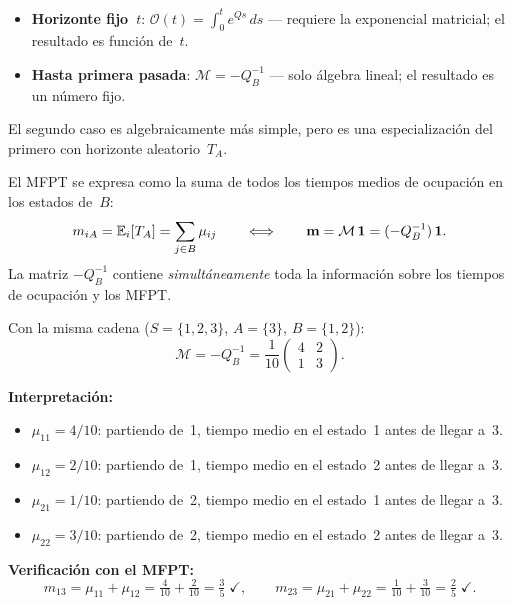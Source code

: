 \documentclass[11pt, letterpaper]{article}
\begin{document}
\begin{notabox}
  \begin{itemize}
    \item \textbf{Horizonte fijo~$t$}: $\mathcal{O}(t)=\int_0^t e^{Qs}\,ds$
      — requiere la exponencial matricial; el resultado es función de~$t$.
    \item \textbf{Hasta primera pasada}: $\mathcal{M}=-Q_B^{-1}$
      — solo álgebra lineal; el resultado es un número fijo.
  \end{itemize}
  El segundo caso es algebraicamente más simple, pero es una
  especialización del primero con horizonte aleatorio~$T_A$.
\end{notabox}

\begin{notabox}
  El MFPT se expresa como la suma de todos los tiempos medios de
  ocupación en los estados de~$B$:
  \[
    m_{iA} = \mathbb{E}_i[T_A] = \sum_{j\in B} \mu_{ij}
    \qquad\Longleftrightarrow\qquad
    \mathbf{m} = \mathcal{M}\,\mathbf{1} = (-Q_B^{-1})\,\mathbf{1}.
  \]
  La matriz $-Q_B^{-1}$ contiene \emph{simultáneamente} toda la
  información sobre los tiempos de ocupación y los MFPT.
\end{notabox}

\begin{ejemplobox}
  Con la misma cadena ($S=\{1,2,3\}$, $A=\{3\}$, $B=\{1,2\}$):
  \[
    \mathcal{M} = -Q_B^{-1}
    = \frac{1}{10}\begin{pmatrix} 4 & 2 \\ 1 & 3 \end{pmatrix}.
  \]

  \textbf{Interpretación:}
  \begin{itemize}
    \item $\mu_{11}=4/10$: partiendo de~1, tiempo medio en el estado~1 antes de llegar a~3.
    \item $\mu_{12}=2/10$: partiendo de~1, tiempo medio en el estado~2 antes de llegar a~3.
    \item $\mu_{21}=1/10$: partiendo de~2, tiempo medio en el estado~1 antes de llegar a~3.
    \item $\mu_{22}=3/10$: partiendo de~2, tiempo medio en el estado~2 antes de llegar a~3.
  \end{itemize}

  \textbf{Verificación con el MFPT:}
  \[
    m_{13} = \mu_{11}+\mu_{12} = \tfrac{4}{10}+\tfrac{2}{10}
    = \tfrac{3}{5}\;\checkmark,
    \qquad
    m_{23} = \mu_{21}+\mu_{22} = \tfrac{1}{10}+\tfrac{3}{10}
    = \tfrac{2}{5}\;\checkmark.
  \]
\end{ejemplobox}
\end{document}
